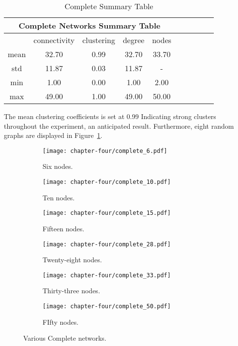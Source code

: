 \begin{table}[!hbtp]
	\centering
	\begin{adjustbox}{width=0.5\textwidth}
		\small
		\begin{tabular}{cccccccccc}
				\toprule
			\multicolumn{5}{|c|}{Complete Networks Summary Table}                     \\ \hline
			     & connectivity & clustering & degree & nodes                  \\ \hline
			mean & 32.70        & 0.99       & 32.70  & 33.70                  \\ \hline
			std  & 11.87        & 0.03       & 11.87  & \multicolumn{1}{c}{-} \\ \hline
			min  & 1.00         & 0.00       & 1.00   & 2.00                   \\ \hline
			max  & 49.00        & 1.00       & 49.00  & 50.00                  \\ \bottomrule
		\end{tabular}
	\end{adjustbox}
	\caption{Complete Summary Table}
	\label{table:complete-summary-table}
\end{table}

The mean clustering coefficients is set at 0.99 Indicating strong clusters
throughout the experiment, an anticipated result. Furthermore, eight random
graphs are displayed in Figure~\ref{complete_networks_illustration}.

\begin{figure}[!hbtp]
	\centering
	\begin{subfigure}[t]{0.30\textwidth}
		\centering
		\texttt{[image: chapter-four/complete\_6.pdf]}
		\caption{Six nodes.}
	\end{subfigure}
	\hfill
	\begin{subfigure}[t]{0.30\textwidth}\centering
		\centering
		\texttt{[image: chapter-four/complete\_10.pdf]}
		\caption{Ten nodes.}
	\end{subfigure}
	\hfill
	\begin{subfigure}[t]{0.30\textwidth}\centering
		\centering
		\texttt{[image: chapter-four/complete\_15.pdf]}
		\caption{Fifteen nodes.}
	\end{subfigure}
	\hfill
	\begin{subfigure}[t]{0.30\textwidth}\centering
		\centering
		\texttt{[image: chapter-four/complete\_28.pdf]}
		\caption{Twenty-eight nodes.}
	\end{subfigure}
	\hfill
	\begin{subfigure}[t]{0.30\textwidth}\centering
		\centering
		\texttt{[image: chapter-four/complete\_33.pdf]}
		\caption{Thirty-three nodes.}
	\end{subfigure}
	\hfill
	\begin{subfigure}[t]{0.30\textwidth}\centering
		\centering
		\texttt{[image: chapter-four/complete\_50.pdf]}
		\caption{FIfty nodes.}
	\end{subfigure}
	\caption{Various Complete networks.}
	\label{complete_networks_illustration}
\end{figure}

